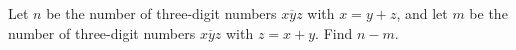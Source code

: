 Let $n$ be the number of three-digit numbers $\overline{xyz}$ with $x=y+z$, and let $m$ be the number of three-digit numbers $\overline{xyz}$ with $z=x+y$. Find $n-m$.
